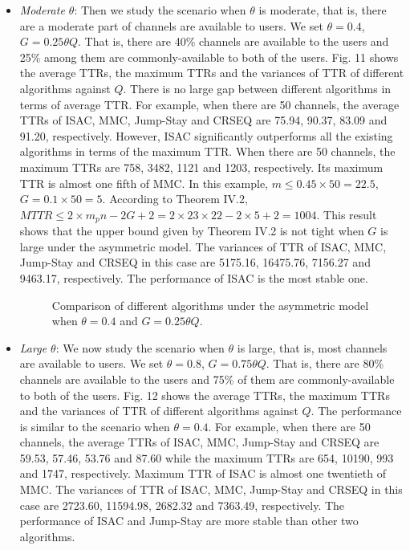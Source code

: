 \documentclass[journal]{IEEEtran}
\begin{document}
\begin{itemize}
\item \emph{Moderate $\theta$}: Then we study the scenario when $\theta$ is moderate, that is, there are a moderate part of channels are available to users. We set $\theta=0.4$, $G=0.25\theta Q$. That is, there are 40\% channels are available to the users and 25\% among them are commonly-available to both of the users. Fig. 11 shows the average TTRs, the maximum TTRs and the variances of TTR of different algorithms against $Q$.  There is no large gap between different algorithms in terms of average TTR. For example, when there are 50 channels, the average TTRs of ISAC, MMC, Jump-Stay and CRSEQ are 75.94, 90.37, 83.09 and 91.20, respectively. However, ISAC significantly outperforms all the existing algorithms in terms of the maximum TTR. When there are 50 channels, the maximum TTRs are 758, 3482, 1121 and 1203, respectively. Its maximum TTR is almost one fifth of MMC. In this example, $m\leq0.45\times50=22.5$, $G=0.1\times50=5$. According to Theorem IV.2, $MTTR\leq 2\times m_pn-2G+2=2\times 23\times 22-2\times5+2=1004$. This result shows that the upper bound given by Theorem IV.2 is not tight when $G$ is large under the asymmetric model. The variances of TTR of ISAC, MMC, Jump-Stay and CRSEQ in this case are 5175.16, 16475.76, 7156.27 and 9463.17, respectively. The performance of ISAC is the most stable one.
\begin{figure}
\centering
{}
\hspace{1in}
\hspace{1in}
\hspace{1in}
\caption{Comparison of different algorithms under the asymmetric model when $\theta=0.4$ and $G=0.25\theta Q$.}
\end{figure}
\item \emph{Large $\theta$}: We now study the scenario when $\theta$ is large, that is, most channels are available to users. We set $\theta=0.8$, $G=0.75\theta Q$. That is, there are 80\% channels are available to the users and 75\% of them are commonly-available to both of the users. Fig. 12 shows the average TTRs, the maximum TTRs and the variances of TTR of different algorithms against $Q$.  The performance is similar to the scenario when $\theta=0.4$. For example, when there are 50 channels, the average TTRs of ISAC, MMC, Jump-Stay and CRSEQ are 59.53, 57.46, 53.76 and 87.60 while the maximum TTRs are 654, 10190, 993 and 1747, respectively. Maximum TTR of ISAC is almost one twentieth of MMC. The variances of TTR of ISAC, MMC, Jump-Stay and CRSEQ in this case are 2723.60, 11594.98, 2682.32 and 7363.49, respectively. The performance of ISAC and Jump-Stay are more stable than other two algorithms.

\end{itemize}
\end{document}
